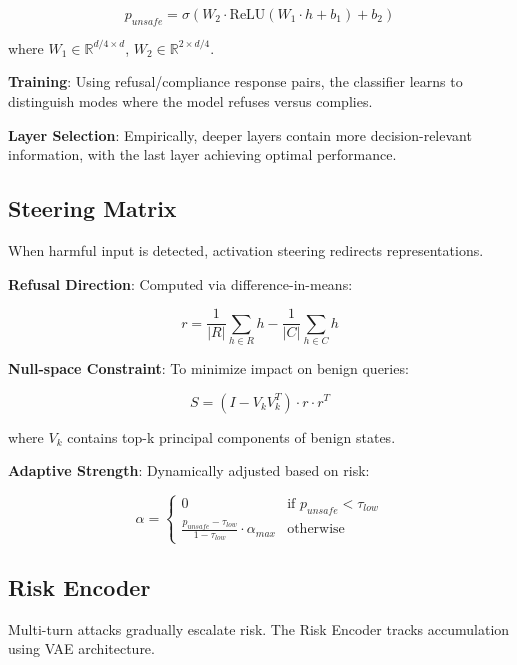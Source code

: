 \documentclass[10pt,twocolumn]{article}
\begin{document}
\begin{equation}
p_{unsafe} = \sigma(W_2 \cdot \text{ReLU}(W_1 \cdot h + b_1) + b_2)
\end{equation}

where $W_1 \in \mathbb{R}^{d/4 \times d}$, $W_2 \in \mathbb{R}^{2 \times d/4}$.

\textbf{Training}: Using refusal/compliance response pairs, the classifier learns to distinguish modes where the model refuses versus complies.

\textbf{Layer Selection}: Empirically, deeper layers contain more decision-relevant information, with the last layer achieving optimal performance.

\subsection{Steering Matrix}

When harmful input is detected, activation steering redirects representations.

\textbf{Refusal Direction}: Computed via difference-in-means:

\begin{equation}
r = \frac{1}{|R|}\sum_{h \in R} h - \frac{1}{|C|}\sum_{h \in C} h
\end{equation}

\textbf{Null-space Constraint}: To minimize impact on benign queries:

\begin{equation}
S = (I - V_k V_k^T) \cdot r \cdot r^T
\end{equation}

where $V_k$ contains top-k principal components of benign states.

\textbf{Adaptive Strength}: Dynamically adjusted based on risk:

\begin{equation}
\alpha = \begin{cases} 0 & \text{if } p_{unsafe} < \tau_{low} \\ \frac{p_{unsafe} - \tau_{low}}{1 - \tau_{low}} \cdot \alpha_{max} & \text{otherwise} \end{cases}
\end{equation}

\subsection{Risk Encoder}

Multi-turn attacks gradually escalate risk. The Risk Encoder tracks accumulation using VAE architecture.
\end{document}
